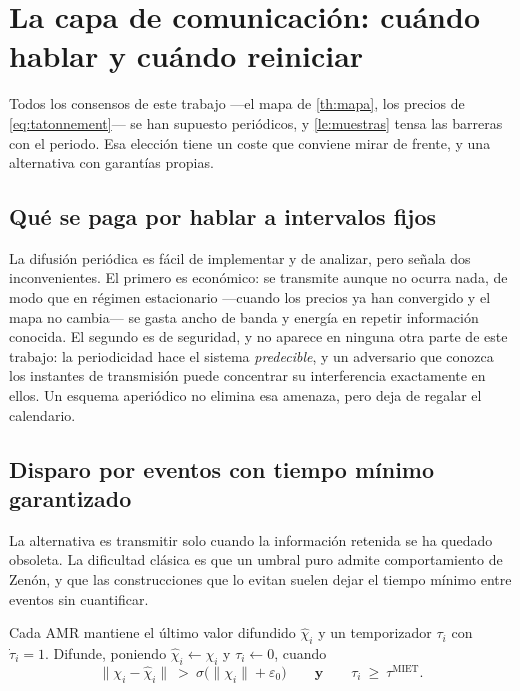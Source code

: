 \section{La capa de comunicación: cuándo hablar y cuándo reiniciar}
\label{sec:comunicacion}

Todos los consensos de este trabajo —el mapa de \cref{th:mapa}, los precios de
\eqref{eq:tatonnement}— se han supuesto periódicos, y \cref{le:muestras} tensa
las barreras con el periodo. Esa elección tiene un coste que conviene mirar de
frente, y una alternativa con garantías propias.

\subsection{Qué se paga por hablar a intervalos fijos}

\begin{observacion}
\label{obs:objeciones-periodico}
La difusión periódica es fácil de implementar y de analizar, pero
\cite{zhao2024hybrid} señala dos inconvenientes. El primero es económico: se
transmite aunque no ocurra nada, de modo que en régimen estacionario —cuando los
precios ya han convergido y el mapa no cambia— se gasta ancho de banda y energía
en repetir información conocida. El segundo es de seguridad, y no aparece en
ninguna otra parte de este trabajo: la periodicidad hace el sistema
\emph{predecible}, y un adversario que conozca los instantes de transmisión
puede concentrar su interferencia exactamente en ellos. Un esquema aperiódico no
elimina esa amenaza, pero deja de regalar el calendario.
\end{observacion}

\subsection{Disparo por eventos con tiempo mínimo garantizado}

La alternativa es transmitir solo cuando la información retenida se ha quedado
obsoleta. La dificultad clásica es que un umbral puro admite comportamiento de
Zenón, y que las construcciones que lo evitan suelen dejar el tiempo mínimo
entre eventos sin cuantificar.

\begin{definicion}
\label{def:etm}
Cada AMR mantiene el último valor difundido $\hat\chi_i$ y un temporizador
$\tau_i$ con $\dot\tau_i=1$. Difunde, poniendo $\hat\chi_i\leftarrow\chi_i$ y
$\tau_i\leftarrow0$, cuando
\[
  \lVert \chi_i-\hat\chi_i\rVert\ >\ \sigma\bigl(\lVert\chi_i\rVert+\varepsilon_0\bigr)
  \qquad\textbf{y}\qquad \tau_i\ \ge\ \tau^{\mathrm{MIET}} .
\]
\end{definicion}

